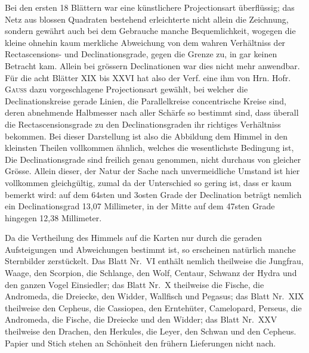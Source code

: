 Bei den ersten 18 Blättern war eine künstlichere Projectionsart überflüssig; das Netz aus blossen Quadraten bestehend erleichterte nicht allein die Zeichnung, sondern gewährt auch bei dem Gebrauche manche Bequemlichkeit, wogegen die kleine ohnehin kaum merkliche Abweichung von dem wahren Verhältniss der Rectascensions- und Declinationsgrade, gegen die Grenze zu, in gar keinen Betracht kam. Allein bei grössern Declinationen war dies nicht mehr anwendbar. Für die acht Blätter XIX bis XXVI hat also der Verf. eine ihm von Hrn. Hofr. \textsc{Gauss} dazu vorgeschlagene Projectionsart gewählt, bei welcher die Declinationskreise gerade Linien, die Parallelkreise concentrische Kreise sind, deren abnehmende Halbmesser nach aller Schärfe so bestimmt sind, dass überall die Rectascensionsgrade zu den Declinationsgraden ihr richtiges Verhältniss bekommen. Bei dieser Darstellung ist also die Abbildung dem Himmel in den kleinsten Theilen vollkommen ähnlich, welches die wesentlichste Bedingung ist, Die Declinationsgrade sind freilich genau genommen, nicht durchaus von gleicher Grösse. Allein dieser, der Natur der Sache nach unvermeidliche Umstand ist hier vollkommen gleichgültig, zumal da der Unterschied so gering ist, dass er kaum bemerkt wird: auf dem 64sten und 3osten Grade der Declination beträgt nemlich ein Declinationsgrad 13,07 Millimeter, in der Mitte auf dem 47sten Grade hingegen 12,38 Millimeter.

Da die Vertheilung des Himmels auf die Karten nur durch die geraden Aufsteigungen und Abweichungen bestimmt ist, so erscheinen natürlich manche Sternbilder zerstückelt. Das Blatt Nr.\ VI enthält nemlich theilweise die Jungfrau, Waage, den Scorpion, die Schlange, den Wolf, Centaur, Schwanz der Hydra und den ganzen Vogel Einsiedler; das Blatt Nr.\ X theilweise die Fische, die Andromeda, die Dreiecke, den Widder, Wallfisch und Pegasus; das Blatt Nr.\ XIX theilweise den Cepheus, die Cassiopea, den Erntehüter, Camelopard, Perseus, die Andromeda, die Fische, die Dreiecke und den Widder; das Blatt Nr.\ XXV theilweise den Drachen, den Herkules, die Leyer, den Schwan und den Cepheus. Papier und Stich stehen an Schönheit den frühern Lieferungen nicht nach.
